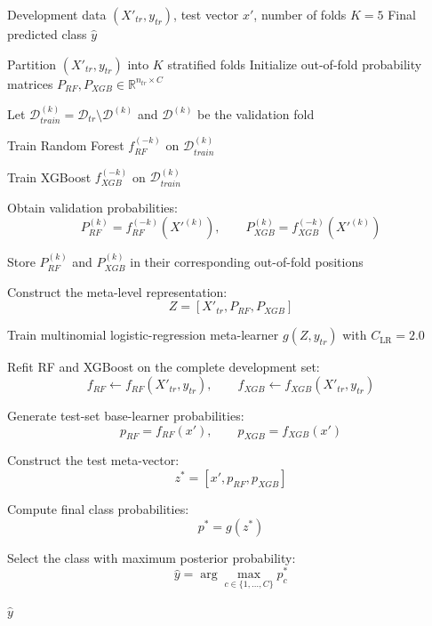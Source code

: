 \documentclass{elektr}
\begin{document}
\begin{algorithm}[H]
\caption{Out-of-Fold RF--XGBoost Stacking}
\label{alg:stack}
\small
\begin{algorithmic}[1]
\Require Development data $(X'_{tr},y_{tr})$, test vector $x'$, 
number of folds $K=5$
\Ensure Final predicted class $\hat{y}$

\State Partition $(X'_{tr},y_{tr})$ into $K$ stratified folds
\State Initialize out-of-fold probability matrices
$P_{RF},P_{XGB}\in\mathbb{R}^{n_{tr}\times C}$


    \State Let $\mathcal{D}_{train}^{(k)}
    =\mathcal{D}_{tr}\setminus\mathcal{D}^{(k)}$
    and $\mathcal{D}^{(k)}$ be the validation fold

    \State Train Random Forest $f_{RF}^{(-k)}$
    on $\mathcal{D}_{train}^{(k)}$

    \State Train XGBoost $f_{XGB}^{(-k)}$
    on $\mathcal{D}_{train}^{(k)}$

    \State Obtain validation probabilities:
    \[
    P_{RF}^{(k)}
    =f_{RF}^{(-k)}(X'^{(k)}),\qquad
    P_{XGB}^{(k)}
    =f_{XGB}^{(-k)}(X'^{(k)})
    \]

    \State Store $P_{RF}^{(k)}$ and $P_{XGB}^{(k)}$
    in their corresponding out-of-fold positions

\EndFor

\State Construct the meta-level representation:
\[
Z=
\left[
X'_{tr},P_{RF},P_{XGB}
\right]
\]

\State Train multinomial logistic-regression meta-learner
$g(Z,y_{tr})$ with $C_{\mathrm{LR}}=2.0$

\State Refit RF and XGBoost on the complete development set:
\[
f_{RF}\leftarrow f_{RF}(X'_{tr},y_{tr}),
\qquad
f_{XGB}\leftarrow f_{XGB}(X'_{tr},y_{tr})
\]

\State Generate test-set base-learner probabilities:
\[
p_{RF}=f_{RF}(x'),\qquad
p_{XGB}=f_{XGB}(x')
\]

\State Construct the test meta-vector:
\[
z^*=[x',p_{RF},p_{XGB}]
\]

\State Compute final class probabilities:
\[
p^*=g(z^*)
\]

\State Select the class with maximum posterior probability:
\[
\hat{y}=\arg\max_{c\in\{1,\ldots,C\}}p_c^*
\]

\State \Return $\hat{y}$

\end{algorithmic}
\end{algorithm}
\end{document}
